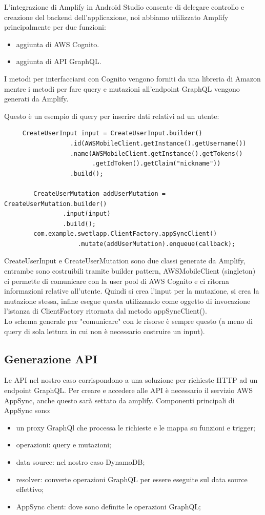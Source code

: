 L'integrazione di Amplify in Android Studio consente di delegare controllo e creazione del backend dell'applicazione, noi abbiamo utilizzato Amplify principalmente per due funzioni:

\begin{itemize}
    \item aggiunta di AWS Cognito.
    \item aggiunta di API GraphQL.
\end{itemize}

I metodi per interfacciarsi con Cognito vengono forniti da una libreria di Amazon mentre i metodi per fare query e mutazioni all'endpoint GraphQL vengono generati da Amplify.


Questo è un esempio di query per inserire dati relativi ad un utente:

\begin{verbatim}
     CreateUserInput input = CreateUserInput.builder()
                  .id(AWSMobileClient.getInstance().getUsername())
                  .name(AWSMobileClient.getInstance().getTokens()
                  		.getIdToken().getClaim("nickname"))
                  .build();

        CreateUserMutation addUserMutation = CreateUserMutation.builder()
                .input(input)
                .build();
        com.example.swetlapp.ClientFactory.appSyncClient()
        			.mutate(addUserMutation).enqueue(callback);
\end{verbatim}

CreateUserInput e CreateUserMutation sono due classi generate da Amplify, entrambe sono costruibili tramite builder pattern, AWSMobileClient (singleton) ci permette di comunicare con la user pool di AWS Cognito e ci ritorna informazioni relative all'utente. Quindi si crea l'input per la mutazione, si crea la mutazione stessa, infine esegue questa utilizzando come oggetto di invocazione l'istanza di ClientFactory ritornata dal metodo appSyncClient().\\
Lo schema generale per "comunicare" con le risorse è sempre questo (a meno di query di sola lettura in cui non è necessario costruire un input).


\subsection{Generazione API}

Le API nel nostro caso corrispondono a una soluzione per richieste HTTP ad un endpoint GraphQL.
Per creare e accedere alle API è necessario il servizio AWS AppSync, anche questo sarà settato da amplify.
Componenti principali di AppSync sono:
\begin{itemize}
\item un proxy GraphQl che processa le richieste e le mappa su funzioni e trigger;
\item operazioni: query e mutazioni;
\item data source: nel nostro caso DynamoDB;
\item resolver: converte operazioni GraphQL per essere eseguite sul data source effettivo;
\item AppSync client: dove sono definite le operazioni GraphQL;
\end{itemize}

